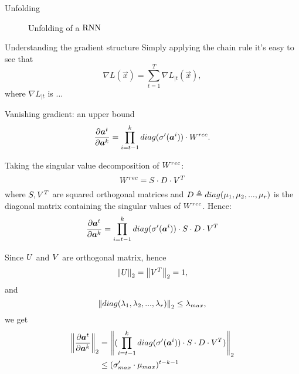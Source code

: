 \begin{frame}{Unfolding}
\begin{figure}[h!]
{
	}
		\caption{Unfolding of a $\mathrm{RNN}$}
		\label{rnn_unfolding}
	\end{figure}
\end{frame}

\begin{frame}{Understanding the gradient structure}
	Simply applying the chain rule it's easy to see that
	\begin{equation}
		\nabla L(\vec{x}) = \sum_{t=1}^T \nabla L_{|t}(\vec{x}),
	\end{equation}
	where $\nabla L_{|t}$ is ...
\end{frame}

\begin{frame}{Vanishing gradient: an upper bound}
	\begin{equation}
	\frac{\partial \boldsymbol{a}^t}{\partial \boldsymbol{a}^k} = \prod_{i=t-1}^{k}  diag(\sigma'(\boldsymbol{a}^i)) \cdot W^{rec}.
	\label{eq:temporalComponent}
	\end{equation}
	
	Taking the singular value decomposition of $W^{rec}$:
	\begin{equation}
	W^{rec} =  S\cdot D\cdot V^T
	\end{equation}
	where $S,V^T$ are squared orthogonal matrices and $D\triangleq diag(\mu_1, \mu_2,...,\mu_r)$ is the diagonal matrix containing the singular values of $W^{rec}$.
	Hence:
	\begin{equation}
	\frac{\partial \boldsymbol{a}^t}{\partial \boldsymbol{a}^k} = \prod_{i=t-1}^{k}  diag(\sigma'(\boldsymbol{a}^i)) \cdot S\cdot D \cdot V^T
	\end{equation}
	\end{frame}
	\begin{frame}
			Since $U$ and $V$ are orthogonal matrix, hence $$\left\Vert U \right\Vert_2=\left\Vert V^T \right\Vert_2 = 1,$$ and $$\left\Vert diag(\lambda_1, \lambda_2,...,\lambda_r) \right\Vert_2 \leq \lambda_{max},$$ we get
			\begin{align}
			\left\Vert \frac{\partial \boldsymbol{a}^t}{\partial \boldsymbol{a}^k} \right\Vert_2 &= \left\Vert  (\prod_{i=t-1}^{k} diag(\sigma'(\boldsymbol{a}^i)) \cdot S\cdot D \cdot V^T) \right\Vert_2\\
			&\leq (\sigma'_{max} \cdot \mu_{max})^{t-k-1}
			\end{align}
	\end{frame}



